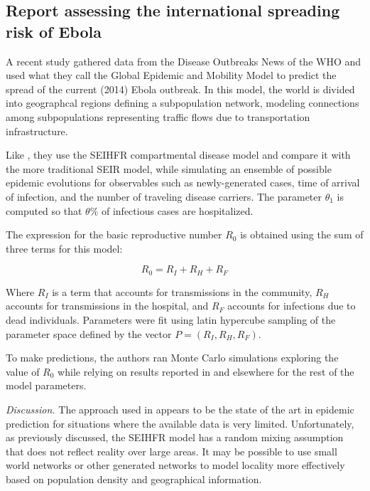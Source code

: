 \documentclass[10pt, journal,onecolumn]{IEEEtran}
\begin{document}
\subsection{\textbf{Report assessing the international spreading risk of Ebola \citep{gomes2014assessing}}}

A recent study \citep{gomes2014assessing} gathered data from the Disease Outbreaks News of
the WHO and used what they call the Global Epidemic and Mobility Model to predict the spread of the
current (2014) Ebola outbreak. In this model, the world is divided into geographcal regions defining a
subpopulation network, modeling connections among subpopulations representing traffic flows due to
transportation infrastructure.

Like \citep{legrand2007understanding}, they use the SEIHFR compartmental disease model and compare
it with the more traditional SEIR model, while simulating
an ensemble of possible epidemic evolutions for observables such as newly-generated
cases, time of arrival of infection, and the number of traveling disease carriers.
The parameter $\theta_1$ is computed so that $\theta\%$ of infectious cases
are hospitalized.

The expression for the basic reproductive number $R_0$ is obtained using the sum of three terms
for this model:

$$
R_0 = R_I + R_H + R_F
$$

Where $R_I$ is a term that accounts for transmissions in the community, $R_H$ accounts for
transmissions in the hospital, and $R_F$ accounts for infections due to dead individuals.
Parameters were fit using latin hypercube sampling of the parameter space defined by the
vector $P = (R_I, R_H, R_F)$.

To make predictions, the authors ran Monte Carlo simulations exploring the value of $R_0$ while relying on results reported
in \citep{legrand2007understanding} and elsewhere for the rest of the model parameters.

\textit{Discussion.} The approach used in \citep{legrand2007understanding} appears to be the state of the art in epidemic prediction for
situations where the available data is very limited. Unfortunately, as previously discussed, the
SEIHFR model has a random mixing assumption that does not reflect reality over large areas.
It may be possible to use small world networks or other generated networks to model locality
more effectively based on population density and geographical information.

\bigskip
\end{document}
